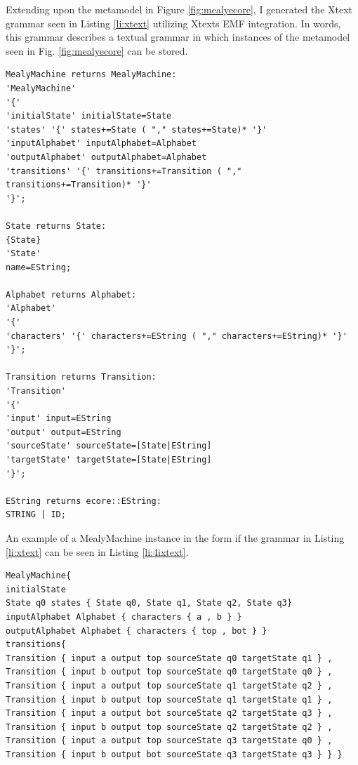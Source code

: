 Extending upon the metamodel in Figure \ref*{fig:mealyecore}, I generated the Xtext grammar seen in Listing \ref{li:xtext} utilizing Xtexts EMF integration. In words, this  grammar describes a textual grammar in which instances of the metamodel seen in Fig. \ref{fig:mealyecore} can be stored. 



\begin{lstlisting}[caption=Xtext grammar describing Mealy machines.,label=li:xtext]
MealyMachine returns MealyMachine:
'MealyMachine'
'{'
'initialState' initialState=State
'states' '{' states+=State ( "," states+=State)* '}' 
'inputAlphabet' inputAlphabet=Alphabet
'outputAlphabet' outputAlphabet=Alphabet
'transitions' '{' transitions+=Transition ( "," transitions+=Transition)* '}' 
'}';

State returns State:
{State}
'State'
name=EString;

Alphabet returns Alphabet:
'Alphabet'
'{'
'characters' '{' characters+=EString ( "," characters+=EString)* '}' 
'}';

Transition returns Transition:
'Transition'
'{'
'input' input=EString
'output' output=EString
'sourceState' sourceState=[State|EString]
'targetState' targetState=[State|EString]
'}';

EString returns ecore::EString:
STRING | ID;
\end{lstlisting}

An example of a MealyMachine instance in the form if the grammar in Listing \ref{li:xtext} can be seen in Listing \ref{li:4ixtext}.

\begin{lstlisting}[caption=The Mealy machine seen in Fig.\ref{fig:dfaexamplemealyver}.a in the form of the Xtext grammar described in Listing \ref{li:xtext}.,label=li:4ixtext]
MealyMachine{
initialState 
State q0 states { State q0, State q1, State q2, State q3}
inputAlphabet Alphabet { characters { a , b } }
outputAlphabet Alphabet { characters { top , bot } }
transitions{ 
Transition { input a output top sourceState q0 targetState q1 } , 
Transition { input b output top sourceState q0 targetState q0 } , 
Transition { input a output top sourceState q1 targetState q2 } , 
Transition { input b output top sourceState q1 targetState q1 } , 
Transition { input a output bot sourceState q2 targetState q3 } , 
Transition { input b output top sourceState q2 targetState q2 } , 
Transition { input a output top sourceState q3 targetState q0 } , 
Transition { input b output bot sourceState q3 targetState q3 } } }
\end{lstlisting}

